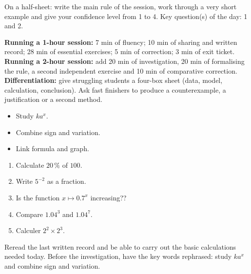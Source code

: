 \begin{sortie}On a half-sheet: write the main rule of the session, work through a very short example and give your confidence level from 1 to 4. Key question(s) of the day: 1 and 2.\end{sortie}

\ifprof
\begin{methode}
\textbf{Running a 1-hour session:} 7 min of fluency; 10 min of sharing and written record; 28 min of essential exercises; 5 min of correction; 3 min of exit ticket.\\
\textbf{Running a 2-hour session:} add 20 min of investigation, 20 min of formalising the rule, a second independent exercise and 10 min of comparative correction.\\
\textbf{Differentiation:} give struggling students a four-box sheet (data, model, calculation, conclusion). Ask fast finishers to produce a counterexample, a justification or a second method.
\end{methode}
\fi
{}
\begin{objectifs}\begin{itemize}\item Study $ka^x$.\item Combine sign and variation.\item Link formula and graph.\end{itemize}\end{objectifs}
\begin{automatismes}\begin{enumerate}\item Calculate $20\,\%$ of $100$. \item Write $5^{-2}$ as a fraction. \item Is the function $x\mapsto0.7^x$ increasing?? \item Compare $1.04^3$ and $1.04^7$. \item Calculer $2^2\times2^3$. \end{enumerate}\end{automatismes}
\begin{prerequis}Reread the last written record and be able to carry out the basic calculations needed today. Before the investigation, have the key words rephrased: study $ka^x$ and combine sign and variation.\end{prerequis}

